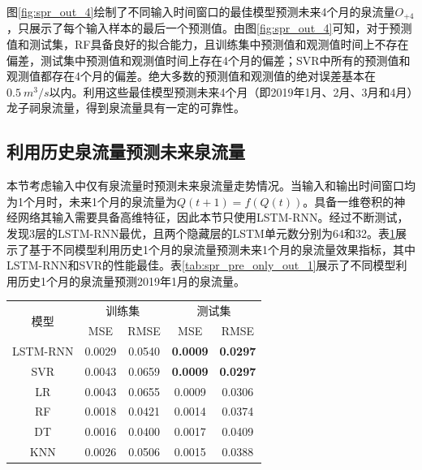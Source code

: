 图\ref{fig:spr_out_4}绘制了不同输入时间窗口的最佳模型预测未来4个月的泉流量$O_{+4}$，只展示了每个输入样本的最后一个预测值。由图\ref{fig:spr_out_4}可知，对于预测值和测试集，RF具备良好的拟合能力，且训练集中预测值和观测值时间上不存在偏差，测试集中预测值和观测值时间上存在4个月的偏差；SVR中所有的预测值和观测值都存在4个月的偏差。绝大多数的预测值和观测值的绝对误差基本在$\SI{0.5}{m^{3}/s}$以内。利用这些最佳模型预测未来4个月（即2019年1月、2月、3月和4月）龙子祠泉流量，得到泉流量具有一定的可靠性。

\subsection{利用历史泉流量预测未来泉流量}\label{sec:spr_only}

本节考虑输入中仅有泉流量时预测未来泉流量走势情况。当输入和输出时间窗口均为1个月时，未来1个月的泉流量为$Q(t+1)=f(Q(t))$。具备一维卷积的神经网络其输入需要具备高维特征，因此本节只使用LSTM-RNN。经过不断测试，发现3层的LSTM-RNN最优，且两个隐藏层的LSTM单元数分别为64和32。表\ref{tab:spr_indicators_only_out_1}展示了基于不同模型利用历史1个月的泉流量预测未来1个月的泉流量效果指标，其中LSTM-RNN和SVR的性能最佳。表\ref{tab:spr_pre_only_out_1}展示了不同模型利用历史1个月的泉流量预测2019年1月的泉流量。

\begin{table}[!htbp]
  \centering
  \label{tab:spr_indicators_only_out_1}
  \footnotesize
  \renewcommand{\arraystretch}{1}
  \begin{tabular}{ccccc}
    \toprule
    \multirow{2}{*}{模型} & \multicolumn{2}{c}{训练集} & \multicolumn{2}{c}{测试集}\\
    \cmidrule(lr){2-3} \cmidrule(lr){4-5}
    \noalign{\smallskip}
    & MSE & RMSE & MSE & RMSE \\
    \midrule 
    LSTM-RNN & 0.0029 & 0.0540 & \textbf{0.0009} & \textbf{0.0297} \\
    SVR & 0.0043 & 0.0659 & \textbf{0.0009} & \textbf{0.0297} \\
    LR & 0.0043 & 0.0655 & 0.0009 & 0.0306 \\
    RF & 0.0018 & 0.0421 & 0.0014 & 0.0374 \\
    DT & 0.0016 & 0.0400 & 0.0017 & 0.0409 \\
    KNN & 0.0026 & 0.0506 & 0.0015 & 0.0388 \\
    \bottomrule
  \end{tabular}
\end{table}

